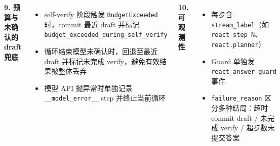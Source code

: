 \documentclass[11pt, aspectratio=169]{beamer}
\begin{document}
\begin{frame}[t]
\begin{columns}[T,onlytextwidth]
\vspace{0.3em}

\textbf{9. 预算与未确认的 draft 兜底}
\begin{itemize}
    \setlength\itemsep{0.05em}
    \item self-verify 阶段触发 \texttt{BudgetExceeded} 时，commit 最近 draft 并标记 \texttt{budget\_exceeded\_during\_self\_verify}
    \item 循环结束模型未确认时，回退至最近 draft 并标记未完成 verify，避免有效结果被整体丢弃
    \item 模型 API 抛异常时单独记录 \texttt{\_\_model\_error\_\_} step 并终止当前循环
\end{itemize}

\vspace{0.3em}

\textbf{10. 可观测性}
\begin{itemize}
    \setlength\itemsep{0.05em}
    \item 每步含 \texttt{stream\_label}（如 \texttt{react step N}、\texttt{react.planner}）
    \item Guard 单独发 \texttt{react\_answer\_guard} 事件
    \item \texttt{failure\_reason} 区分多种结局：超时 commit draft / 未完成 verify / 超步数未提交答案
\end{itemize}

\end{columns}
\end{frame}
\end{document}
